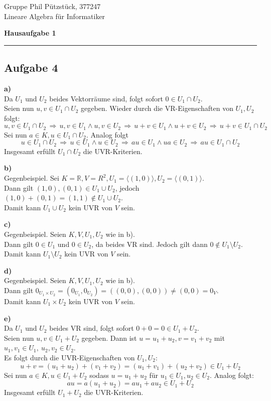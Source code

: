 \documentclass[a4paper,graphics,11pt]{article}
\newcommand{\aufgabe}[1]{\subsection*{Aufgabe #1}}
\begin{document}
\noindent Gruppe              \hfill Phil Pützstück, 377247\\
\noindent Lineare Algebra für Informatiker\\
\begin{center}
	\LARGE{\textbf{Hausaufgabe 1}}
\end{center}
\begin{center}
\rule[0.1ex]{\textwidth}{1pt}
\end{center}



\aufgabe{4}
\textbf{a)}\\
Da $U_1$ und $U_2$ beides Vektorräume sind, folgt sofort $0 \in U_1 \cap U_2$.\\
Seien nun $u,v \in U_1 \cap U_2$ gegeben. Wieder durch die VR-Eigenschaften von $U_1, U_2$ folgt:
$$
    u,v \in U_1 \cap U_2
    \,\Longrightarrow\, u,v \in U_1 \land u,v \in U_2
    \,\Longrightarrow\, u+v \in U_1 \land u+v \in U_2
    \,\Longrightarrow\, u+v \in U_1 \cap U_2
$$
Sei nun $a \in K, u \in U_1 \cap U_2$. Analog folgt
$$
    u \in U_1 \cap U_2
    \,\Longrightarrow\, u \in U_1 \land u \in U_2
    \,\Longrightarrow\, au \in U_1 \land ua \in U_2
    \,\Longrightarrow\, au \in U_1 \cap U_2
$$
Insgesamt erfüllt $U_1 \cap U_2$ die UVR-Kriterien.

\textbf{b)}\\
Gegenbeispiel. Sei $K = \mathbb{R}, V = R^2, U_1 = \langle(1,0)\rangle, U_2 = \langle(0,1)\rangle$.\\
Dann gilt $(1,0),(0,1) \in U_1 \cup U_2$, jedoch $(1,0) + (0,1) = (1,1) \notin U_1 \cup U_2$.\\
Damit kann $U_1 \cup U_2$ kein UVR von $V$ sein.

\textbf{c)}\\
Gegenbeispiel. Seien $K,V,U_1,U_2$ wie in b).\\
Dann gilt $0 \in U_1$ und $0 \in U_2$, da beides VR sind. Jedoch gilt dann $0 \notin U_1 \setminus U_2$.\\
Damit kann $U_1 \setminus U_2$ kein UVR von $V$ sein.

\textbf{d)}\\
Gegenbeispiel. Seien $K,V,U_1,U_2$ wie in b).\\
Dann gilt $0_{U_1 \times U_2} = (0_{U_1}, 0_{U_2}) = ((0,0),(0,0)) \neq (0,0) = 0_{V}$.\\
Damit kann $U_1 \times U_2$ kein UVR von $V$ sein.

\textbf{e)}\\
Da $U_1$ und $U_2$ beides VR sind, folgt sofort $0 + 0 = 0 \in U_1 + U_2$.\\
Seien nun $u,v \in U_1 + U_2$ gegeben. Dann ist $u = u_1 + u_2, v = v_1 + v_2$ mit $u_1,v_1 \in U_1,\ u_2,v_2 \in U_2$.\\
Es folgt durch die UVR-Eigenschaften von $U_1, U_2:$
$$
    u+v = (u_1+u_2) + (v_1+v_2) = (u_1+v_1) + (u_2+v_2) \in U_1 + U_2
$$
Sei nun $a \in K, u \in U_1+U_2$ sodass $u = u_1 + u_2$ für $u_1 \in U_1, u_2 \in U_2$. Analog folgt:
$$
    au = a(u_1 + u_2) = au_1 + au_2 \in U_1 + U_2
$$
Insgesamt erfüllt $U_1 + U_2$ die UVR-Kriterien.
\end{document}

